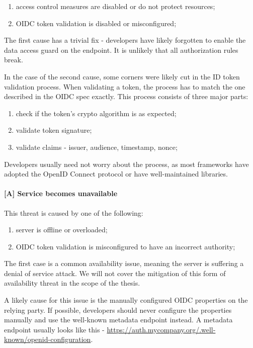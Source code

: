 \begin{enumerate}
  \item access control measures are disabled or do not protect resources;
  \item OIDC token validation is disabled or misconfigured;
\end{enumerate}

The first cause has a trivial fix - developers have likely forgotten to enable the data access guard on the endpoint. It is unlikely that all authorization rules break.

In the case of the second cause, some corners were likely cut in the ID token validation process. When validating a token, the process has to match the one described in the OIDC spec \cite{oidc} exactly. This process consists of three major parts:

\begin{enumerate}
  \item check if the token's crypto algorithm is as expected;
  \item validate token signature;
  \item validate claims - issuer, audience, timestamp, nonce;
\end{enumerate}

Developers usually need not worry about the process, as most frameworks have adopted the OpenID Connect protocol or have well-maintained libraries.

\paragraph{[A] Service becomes unavailable} This threat is caused by one of the following:

\begin{enumerate}
  \item server is offline or overloaded;
  \item OIDC token validation is misconfigured to have an incorrect authority;
\end{enumerate}

The first case is a common availability issue, meaning the server is suffering a denial of service attack. We will not cover the mitigation of this form of availability threat in the scope of the thesis.

A likely cause for this issue is the manually configured OIDC properties on the relying party. If possible, developers should never configure the properties manually and use the well-known metadata endpoint instead. A metadata endpoint usually looks like this - \url{https://auth.mycompany.org/.well-known/openid-configuration}.


